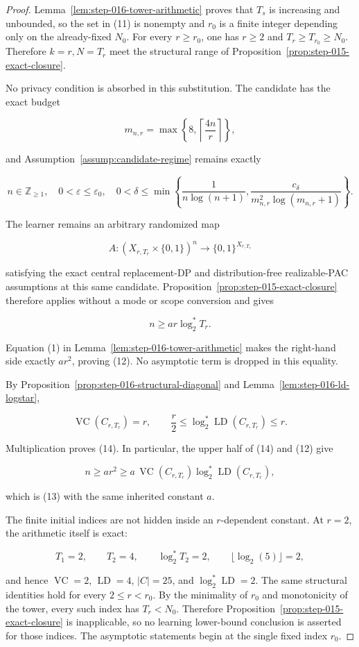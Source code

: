 \begin{proof}
Lemma~\ref{lem:step-016-tower-arithmetic} proves that \(T_s\) is
increasing and unbounded, so the set in (11) is nonempty and \(r_0\) is a
finite integer depending only on the already-fixed \(N_0\). For every
\(r\ge r_0\), one has \(r\ge2\) and \(T_r\ge T_{r_0}\ge N_0\).
Therefore \(k=r,N=T_r\) meet the structural range of Proposition~\ref{prop:step-015-exact-closure}.

No privacy condition is absorbed in this substitution. The candidate has
the exact budget

\[
m_{n,r}=\max\left\{8,\left\lceil\frac{4n}{r}\right\rceil\right\},
\]

and Assumption~\ref{assump:candidate-regime} remains exactly

\[
n\in\mathbb Z_{\ge1},
\quad 0<\varepsilon\le\varepsilon_0,
\quad
0<\delta\le
\min\left\{
\frac1{n\log(n+1)},
\frac{c_\delta}{m_{n,r}^2\log(m_{n,r}+1)}
\right\}.
\tag{15}
\]

The learner remains an arbitrary randomized map

\[
A:(X_{r,T_r}\times\{0,1\})^n
  \longrightarrow\{0,1\}^{X_{r,T_r}}
\]

satisfying the exact central replacement-DP and distribution-free
realizable-PAC assumptions at this same candidate. Proposition~\ref{prop:step-015-exact-closure} therefore applies without a
mode or scope conversion and gives

\[
n\ge ar\log_2^*T_r.
\]

Equation (1) in Lemma~\ref{lem:step-016-tower-arithmetic} makes the
right-hand side exactly \(ar^2\), proving (12). No asymptotic term is
dropped in this equality.

By Proposition~\ref{prop:step-016-structural-diagonal} and
Lemma~\ref{lem:step-016-ld-logstar},

\[
\operatorname{VC}(C_{r,T_r})=r,
\qquad
\frac r2
\le\log_2^*\operatorname{LD}(C_{r,T_r})\le r.
\]

Multiplication proves (14). In particular, the upper half of (14) and
(12) give

\[
n\ge ar^2
\ge
a\,\operatorname{VC}(C_{r,T_r})
   \log_2^*\operatorname{LD}(C_{r,T_r}),
\]

which is (13) with the same inherited constant \(a\).

The finite initial indices are not hidden inside an \(r\)-dependent
constant. At \(r=2\), the arithmetic itself is exact:

\[
T_1=2,\qquad T_2=4,\qquad \log_2^*T_2=2,\qquad
\lfloor\log_2(5)\rfloor=2,
\]

and hence \(\operatorname{VC}=2\), \(\operatorname{LD}=4\),
\(|C|=25\), and \(\log_2^*\operatorname{LD}=2\). The same structural
identities hold for every \(2\le r<r_0\). By the minimality of \(r_0\)
and monotonicity of the tower, every such index has \(T_r<N_0\). Therefore
Proposition~\ref{prop:step-015-exact-closure} is inapplicable, so no learning
lower-bound conclusion is asserted for those indices. The asymptotic statements begin
at the single fixed index \(r_0\). \end{proof}

